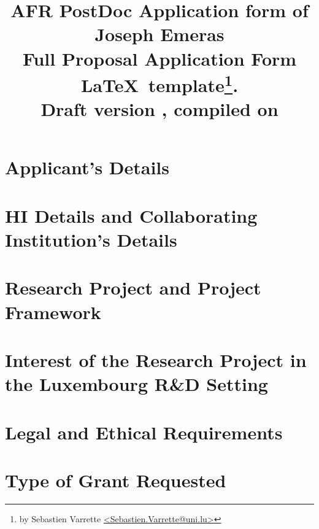 \documentclass[11pt,twoside,a4paper]{article}
\title{\textbf{\Large AFR PostDoc Application form of Joseph Emeras} \\[1em]
  {\small Full Proposal Application Form \LaTeX\ template\thanks{by Sebastien
      Varrette {\small \url{<Sebastien.Varrette@uni.lu>}}}.\\
      \textbf{Draft version \docversion}, compiled on \isodayandtime}
}
\author{}
\date{}
\begin{document}
\maketitle

\tableofcontents
\clearpage

\section{Applicant's Details}



\section{\acf{HI} Details and Collaborating Institution's Details}



\section{Research Project and Project Framework}


\section{Interest of the Research Project in the Luxembourg R\&D Setting}


\section{Legal and Ethical Requirements}


\section{Type of Grant Requested}


\end{document}
